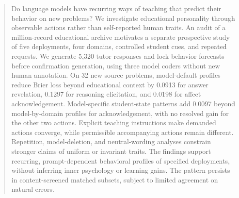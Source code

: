 \begin{abstract}
Do language models have recurring ways of teaching that predict their behavior
on new problems? We investigate educational personality through observable
actions rather than self-reported human traits. An audit of a million-record
educational archive motivates a separate prospective study of five deployments,
four domains, controlled student cues, and repeated requests. We generate
5,320 tutor responses and lock behavior forecasts before confirmation
generation, using three model coders without new human annotation. On 32 new
source problems, model-default profiles reduce Brier loss beyond educational
context by 0.0913 for answer revelation, 0.1297 for reasoning elicitation, and
0.0198 for affect acknowledgement. Model-specific student-state patterns add
0.0097 beyond model-by-domain profiles for acknowledgement, with no resolved
gain for the other two actions. Explicit teaching instructions make demanded
actions converge, while permissible accompanying actions remain different.
Repetition, model-deletion, and neutral-wording analyses constrain stronger
claims of uniform or invariant traits. The findings support recurring,
prompt-dependent behavioral profiles of specified deployments, without inferring
inner psychology or learning gains. The pattern persists in content-screened
matched subsets, subject to limited agreement on natural errors.
\end{abstract}
